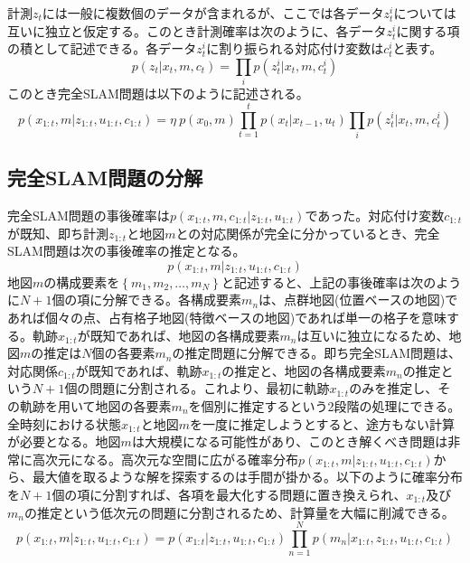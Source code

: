 \documentclass[dvipdfmx,a4paper]{jsarticle}
\begin{document}
計測$z_t$には一般に複数個のデータが含まれるが、ここでは各データ$z_t^i$については互いに独立と仮定する。このとき計測確率は次のように、各データ$z_t^i$に関する項の積として記述できる。各データ$z_t^i$に割り振られる対応付け変数は$c_t^i$と表す。
\begin{equation}
	p(z_t | x_t, m, c_t) = \prod_i p(z_t^i | x_t, m, c_t^i)
\end{equation}
このとき完全SLAM問題は以下のように記述される。
\begin{equation}
	p(x_{1 : t}, m | z_{1 : t}, u_{1 : t}, c_{1 : t}) = \eta \ p(x_0, m) \prod_{t = 1}^t p(x_t | x_{t - 1}, u_t) \prod_i p(z_t^i | x_t, m, c_t^i)
\end{equation}

\subsection{完全SLAM問題の分解}
完全SLAM問題の事後確率は$p(x_{1 : t}, m, c_{1 : t} | z_{1 : t}, u_{1 : t})$であった。対応付け変数$c_{1 : t}$が既知、即ち計測$z_{1 : t}$と地図$m$との対応関係が完全に分かっているとき、完全SLAM問題は次の事後確率の推定となる。
\begin{equation}
	p(x_{1 : t}, m | z_{1 : t}, u_{1 : t}, c_{1 : t})
\end{equation}
地図$m$の構成要素を$\left\{ m_1, m_2, \ldots, m_N \right\}$と記述すると、上記の事後確率は次のように$N + 1$個の項に分解できる。各構成要素$m_n$は、点群地図(位置ベースの地図)であれば個々の点、占有格子地図(特徴ベースの地図)であれば単一の格子を意味する。軌跡$x_{1 : t}$が既知であれば、地図の各構成要素$m_n$は互いに独立になるため、地図$m$の推定は$N$個の各要素$m_n$の推定問題に分解できる。即ち完全SLAM問題は、対応関係$c_{1 : t}$が既知であれば、軌跡$x_{1 : t}$の推定と、地図の各構成要素$m_n$の推定という$N + 1$個の問題に分割される。これより、最初に軌跡$x_{1 : t}$のみを推定し、その軌跡を用いて地図の各要素$m_n$を個別に推定するという2段階の処理にできる。全時刻における状態$x_{1 : t}$と地図$m$を一度に推定しようとすると、途方もない計算が必要となる。地図$m$は大規模になる可能性があり、このとき解くべき問題は非常に高次元になる。高次元な空間に広がる確率分布$p(x_{1 : t}, m | z_{1 : t}, u_{1 : t}, c_{1 : t})$から、最大値を取るような解を探索するのは手間が掛かる。以下のように確率分布を$N + 1$個の項に分割すれば、各項を最大化する問題に置き換えられ、$x_{1 : t}$及び$m_n$の推定という低次元の問題に分割されるため、計算量を大幅に削減できる。
\begin{equation}
	p(x_{1 : t}, m | z_{1 : t}, u_{1 : t}, c_{1 : t}) = p(x_{1 : t} | z_{1 : t}, u_{1 : t}, c_{1 : t}) \prod_{n = 1}^N p(m_n | x_{1 : t}, z_{1 : t}, u_{1 : t}, c_{1 : t})
\end{equation}
\end{document}

